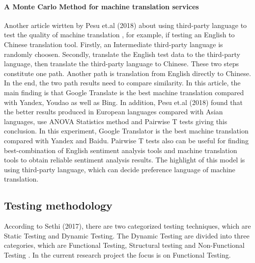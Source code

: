 \documentclass[conference]{IEEEtran}
\begin{document}
\paragraph{A Monte Carlo Method for machine translation services}
Another article wirtten by Pesu et.al (2018) about using third-party language to test the quality of machine
translation \cite{thirdPartMachineTranslation}, for example, if testing an English to Chinese translation tool.
Firstly, an Intermediate third-party language is randomly choosen.
Secondly, translate the English test data to the third-party language, then
translate the third-party language to Chinese.
These two steps constitute one path.
Another path is translation from English directly to Chinese.
In the end, the two path results need to compare similarity. In this article, the main
finding is that Google Translate is the best machine translation compared with
Yandex, Youdao as well as Bing. In addition, Pesu et.al (2018) found that
the better results produced in European languages compared with Asian languages, use ANOVA Statistics
method and Pairwise T tests giving this conclusion.
In this experiment, Google Translator is the best machine translation
compared with Yandex and Baidu. Pairwise T tests also can be useful for finding best-combination of English
sentiment analysis tools and machine translation tools to obtain reliable
sentiment analysis results. The highlight of this model is using third-party
language, which can decide preference language of machine translation.

\subsection{Testing methodology}
According to Sethi (2017), there are two categorized testing
techniques, which are Static Testing and Dynamic Testing. The Dynamic Testing
are divided into three categories, which are Functional Testing, Structural
testing and Non-Functional Testing \cite{testingMethodReview}.
In the current research project the focus is on Functional Testing.
\end{document}
